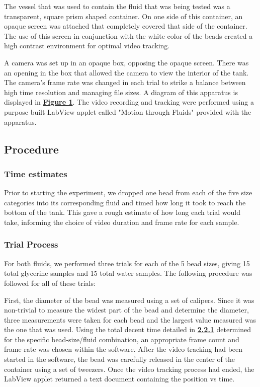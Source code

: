 \documentclass[
	letterpaper
	12pt
]{template}
\newcommand{\bref}[2]{\textbf{\hyperref[#1]{#2}}}
\begin{document}
The vessel that was used to contain the fluid that was being tested was a transparent, square prism shaped container. On one side of this container, an opaque screen was attached that completely covered that side of the container. The use of this screen in conjunction with the white color of the beads created a high contrast environment for optimal video tracking. \vspace{\baselineskip}

A camera was set up in an opaque box, opposing the opaque screen. There was an opening in the box that allowed the camera to view the interior of the tank. The camera's frame rate was changed in each trial to strike a balance between high time resolution and managing file sizes. A diagram of this apparatus is displayed in \bref{fig::apparatus}{Figure 1}. The video recording and tracking were performed using a purpose built LabView applet called "Motion through Fluids" provided with the apparatus.
\subsection{Procedure}
\subsubsection{Time estimates}\label{sec::timeEst}
Prior to starting the experiment, we dropped one bead from each of the five size categories into its corresponding fluid and timed how long it took to reach the bottom of the tank. This gave a rough estimate of how long each trial would take, informing the choice of video duration and frame rate for each sample.
\subsubsection{Trial Process}
For both fluids, we performed three trials for each of the 5 bead sizes, giving 15 total glycerine samples and 15 total water samples. The following procedure was followed for all of these trials: \vspace{\baselineskip}

First, the diameter of the bead was measured using a set of calipers. Since it was non-trivial to measure the widest part of the bead and determine the diameter, three measurements were taken for each bead and the largest value measured was the one that was used. Using the total decent time detailed in \bref{sec::timeEst}{2.2.1} determined for the specific bead-size/fluid combination, an appropriate frame count and frame-rate was chosen within the software. After the video tracking had been started in the software, the bead was carefully released in the center of the container using a set of tweezers. Once the video tracking process had ended, the LabView applet returned a text document containing the position vs time.
\vspace{\baselineskip}
\end{document}
